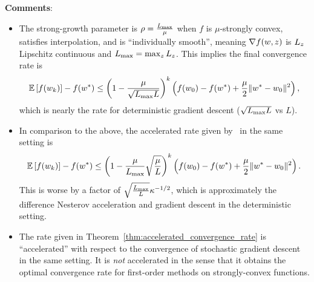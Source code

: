 \textbf{Comments}:
\begin{itemize}
    \item The strong-growth parameter is \( \rho = \frac{L_{\text{max}}}{\mu} \) when \( f \) is \( \mu \)-strongly convex, satisfies interpolation, and is ``individually smooth'', meaning \( \nabla f(w, z) \) is \( L_z \) Lipschitz continuous and \( L_{\text{max}} = \max_z L_z \).
    This implies the final convergence rate is
    \[ \mathbb{E}\left[f(w_k)\right] - f(w^*) \leq \left(1 - \frac{\mu}{\sqrt{L_{\text{max}} L}}\right)^{k} \left( f(w_0) - f(w^*) + \frac{\mu}{2} \|w^* - w_0\|^2 \right), \]
    which is nearly the rate for deterministic gradient descent (\( \sqrt{L_{\text{max}} L} \) vs \( L \)).
    \item In comparison to the above, the accelerated rate given by~\citet{vaswani2019fast} in the same setting is
    \[ \mathbb{E}\left[f(w_k)\right] - f(w^*) \leq \left(1 - \frac{\mu}{L_{\text{max}}} \sqrt{\frac{\mu}{L}}\right)^{k} \left( f(w_0) - f(w^*) + \frac{\mu}{2} \|w^* - w_0\|^2 \right). \]
    This is worse by a factor of \( \sqrt{\frac{L_{\text{max}}}{L}} \kappa^{-1/2} \), which is approximately the difference Nesterov acceleration and gradient descent in the deterministic setting.
    \item The rate given in Theorem~\ref{thm:accelerated_convergence_rate} is ``accelerated'' with respect to the convergence of stochastic gradient descent in the same setting.
    It is \emph{not} accelerated in the sense that it obtains the optimal convergence rate for first-order methods on strongly-convex functions.
\end{itemize}



